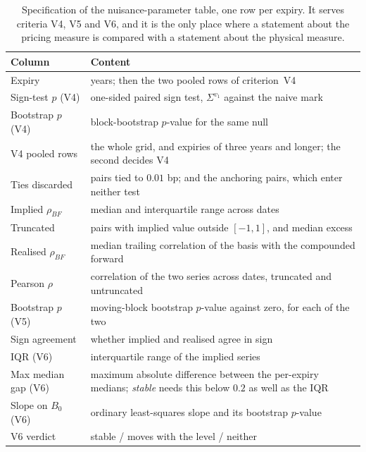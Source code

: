 \documentclass[../../../main.tex]{subfiles}
\begin{document}
\begin{table}[htbp]
\centering\small
\caption{Specification of the nuisance-parameter table, one row per expiry. It serves criteria V4, V5 and V6, and it is the only place where a statement about the pricing measure is compared with a statement about the physical measure.}
\label{tab:usd-ident-rhobf}
\begin{tabular}{@{}ll@{}}
\toprule
Column & Content \\
\midrule
Expiry & years; then the two pooled rows of criterion~V4 \\
Sign-test $p$ (V4) & one-sided paired sign test, $\Sigma^{v_1}$ against the naive mark \\
Bootstrap $p$ (V4) & block-bootstrap $p$-value for the same null \\
V4 pooled rows & the whole grid, and expiries of three years and longer; the second decides V4 \\
Ties discarded & pairs tied to $0.01$ bp; and the anchoring pairs, which enter neither test \\
Implied $\rho_{BF}$ & median and interquartile range across dates \\
Truncated & pairs with implied value outside $[-1,1]$, and median excess \\
Realised $\rho_{BF}$ & median trailing correlation of the basis with the compounded forward \\
Pearson $\rho$ & correlation of the two series across dates, truncated and untruncated \\
Bootstrap $p$ (V5) & moving-block bootstrap $p$-value against zero, for each of the two \\
Sign agreement & whether implied and realised agree in sign \\
IQR (V6) & interquartile range of the implied series \\
Max median gap (V6) & maximum absolute difference between the per-expiry medians; \emph{stable} needs this below $0.2$ as well as the IQR \\
Slope on $B_0$ (V6) & ordinary least-squares slope and its bootstrap $p$-value \\
V6 verdict & stable / moves with the level / neither \\
\bottomrule
\end{tabular}
\end{table}
\end{document}
